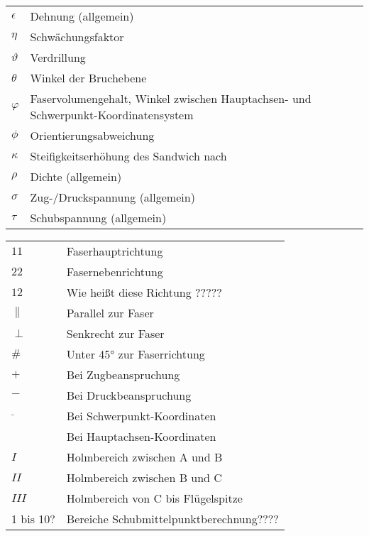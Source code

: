 \begin{table}[h]
	\begin{tabular}{ll}
		$ \epsilon $&Dehnung (allgemein)\\
		$ \eta $&Schwächungsfaktor\\
		$ \vartheta $&Verdrillung\\
		$ \theta $ &Winkel der Bruchebene\\
		$ \varphi $&Faservolumengehalt, Winkel zwischen Hauptachsen- und Schwerpunkt-Koordinatensystem\\
		$ \phi $&Orientierungsabweichung\\
		$ \kappa $&Steifigkeitserhöhung des Sandwich nach \cite{item1}\\
		$ \rho $&Dichte (allgemein)\\
		$ \sigma $&Zug-/Druckspannung (allgemein)\\
		$ \tau $&Schubspannung (allgemein)\\
	\end{tabular}
\end{table}

\begin{table}[h]
	\begin{tabular}{ll}
		$ 11 $&Faserhauptrichtung\\
		$ 22 $&Fasernebenrichtung\\
		$ 12 $&Wie heißt diese Richtung ?????\\
		$ \parallel $&Parallel zur Faser\\
		$ \perp $&Senkrecht zur Faser\\
		$ \# $&Unter 45° zur Faserrichtung\\
		$ + $&Bei Zugbeanspruchung\\
		$ - $&Bei Druckbeanspruchung\\
		$ \bar{ } $&Bei Schwerpunkt-Koordinaten\\
		$ \hat{ } $&Bei Hauptachsen-Koordinaten\\
		$ I $ &Holmbereich zwischen A und B\\
		$ II $ &Holmbereich zwischen B und C\\
		$ III $ &Holmbereich von C bis Flügelspitze\\
		1 bis 10? & Bereiche Schubmittelpunktberechnung????
	\end{tabular}
\end{table}

